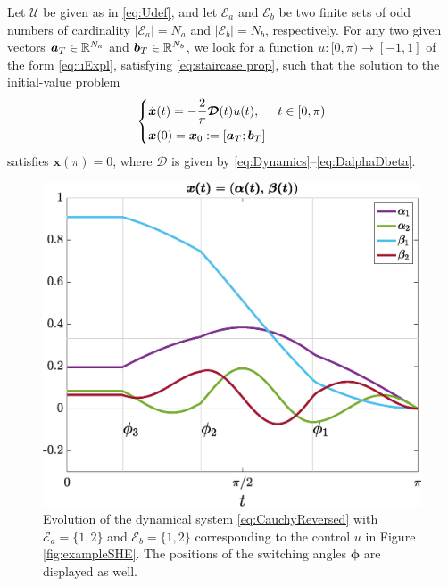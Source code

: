\documentclass[twocolumn]{autart}    %
\begin{document}
\medskip

\begin{problem}\label{pb:SHEpControl}
Let $\mathcal{U}$ be given as in \eqref{eq:Udef}, and let $\mathcal{E}_a $ and $\mathcal{E}_b $ be two finite sets of odd numbers of cardinality $|\mathcal{E}_a| = N_a $ and $ |\mathcal{E}_b| = N_b$, respectively. For any two given vectors $\bm{a}_T \in \mathbb{R}^{N_a}$ and $\bm{b}_T \in \mathbb{R}^{N_b} $,  we look for a function $u: [0,\pi)\to [-1,1]$ of the form \eqref{eq:uExpl}, satisfying \eqref{eq:staircase prop}, such that the solution to the initial-value problem
\begin{equation}\label{eq:CauchyReversed}
	\begin{cases}
        \displaystyle\dot{\bm{x}}(t) = -\frac 2\pi\bm{\mathcal{D}}(t)u(t),  & t \in [0,\pi)
        \\[5pt]
        \bm{x}(0) = \bm{x}_0 := [\bm{a}_T; \bm{b}_T]
    \end{cases}
\end{equation}
satisfies $\bm{x} (\pi) = 0$, where $\bm{\mathcal{D}}$ is given by \eqref{eq:Dynamics}--\eqref{eq:DalphaDbeta}.
\end{problem}

\begin{figure}[ht!] 
    \centering
    \includegraphics[scale=0.325]{img/fig02.eps}
    \caption{Evolution of the dynamical system \eqref{eq:CauchyReversed} with $\mathcal{E}_a = \{1,2\}$ and $\mathcal{E}_b = \{1,2\}$ corresponding to the control $u$ in Figure \ref{fig:exampleSHE}. The positions of the switching angles $\bm{\phi}$ are displayed as well.}\label{fig:evolution_x}
\end{figure}
\end{document}
